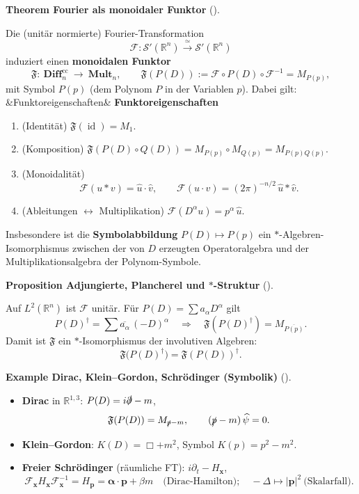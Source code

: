 \documentclass[10pt, letterpaper]{article}
\newcommand{\id}{\operatorname{id}}
\newcommand{\R}{\mathbb{R}}
\newenvironment{romanenum}[1][]
  {%
    \ifx&#1&
    \else
      \textbf{#1}\quad
    \fi
    \begin{enumerate}[label=\roman*)]
  }
  {%
    \end{enumerate}%
  }
\newcommand{\CustomHeading}[3]{%
  \par\medskip\noindent%
  \textbf{#1 #2} \textnormal{(#3)}.\enskip%
}
\newenvironment{PROP}[2]{\begin{unitbox}\CustomHeading{Proposition}{#1}{#2}}{\end{unitbox}}
\newenvironment{THEO}[2]{\begin{unitbox}\CustomHeading{Theorem}{#1}{#2}}{\end{unitbox}}
\newenvironment{EXA}[2]{\begin{unitbox}\CustomHeading{Example}{#1}{#2}}{\end{unitbox}}
\begin{document}
\begin{THEO}{Fourier als monoidaler Funktor}{}
Die (unitär normierte) Fourier-Transformation
\[
\mathcal{F}:\mathcal{S}'(\R^n)\xrightarrow{\ \simeq\ }\mathcal{S}'(\R^n)
\]
induziert einen \textbf{monoidalen Funktor}
\[
\mathfrak{F}:\ \mathbf{Diff}^{\mathrm{cc}}_n\ \longrightarrow\ \mathbf{Mult}_n,\qquad
\mathfrak{F}(P(D)):=\mathcal{F}\circ P(D)\circ\mathcal{F}^{-1}=M_{P(p)},
\]
mit Symbol $P(p)$ (dem Polynom $P$ in der Variablen $p$). Dabei gilt:
\begin{romanenum}[Funktoreigenschaften]
\item (Identität) $\mathfrak{F}(\id)=M_1$.
\item (Komposition) $\mathfrak{F}(P(D)\circ Q(D))=M_{P(p)}\circ M_{Q(p)}=M_{P(p)Q(p)}$.
\item (Monoidalität)
\[
\mathcal{F}(u*v)=\hat u\cdot\hat v,\qquad \mathcal{F}(u\cdot v)=(2\pi)^{-n/2}\,\hat u*\hat v.
\]
\item (Ableitungen $\leftrightarrow$ Multiplikation) $\mathcal{F}(D^\alpha u)=p^\alpha\,\hat u$.
\end{romanenum}
Insbesondere ist die \textbf{Symbolabbildung} $P(D)\mapsto P(p)$ ein $\ast$-Algebren-Isomorphismus zwischen der von $D$ erzeugten Operatoralgebra und der Multiplikationsalgebra der Polynom-Symbole.
\end{THEO}




\begin{PROP}{Adjungierte, Plancherel und $\ast$-Struktur}{}
Auf $L^2(\R^n)$ ist $\mathcal{F}$ unitär. Für $P(D)=\sum a_\alpha D^\alpha$ gilt
\[
P(D)^\dagger=\sum \overline{a_\alpha}\,(-D)^\alpha
\quad\Longrightarrow\quad
\mathfrak{F}(P(D)^\dagger)
=M_{\overline{P(p)}}.
\]
Damit ist $\mathfrak{F}$ ein $\ast$-Isomorphismus der involutiven Algebren:
\[
\mathfrak{F}\big(P(D)^\dagger\big)=\mathfrak{F}(P(D))^\dagger.
\]
\end{PROP}




\begin{EXA}{Dirac, Klein–Gordon, Schrödinger (Symbolik)}{}
\begin{itemize}
\item \textbf{Dirac} in $\R^{1,3}$: $P(D)=i\slashed{\partial}-m$,
\[
\mathfrak{F}(P(D))=M_{\slashed{p}-m},\qquad
(\slashed{p}-m)\,\widehat{\psi}=0.
\]
\item \textbf{Klein–Gordon}: $K(D)=\Box+m^2$, Symbol $K(p)=p^2-m^2$.
\item \textbf{Freier Schrödinger} (räumliche FT): $i\partial_t-H_{\mathbf{x}}$, 
\[
\mathcal{F}_{\mathbf{x}}H_{\mathbf{x}}\mathcal{F}_{\mathbf{x}}^{-1}=H_{\mathbf{p}}=\boldsymbol{\alpha}\!\cdot\!\mathbf{p}+\beta m
\quad\text{(Dirac-Hamilton)};\quad
-\Delta\mapsto |\mathbf{p}|^2\ \text{(Skalarfall)}.
\]
\end{itemize}
\end{EXA}
\end{document}

